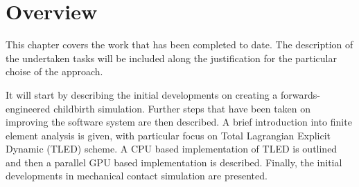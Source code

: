 \section{Overview}\label{methodology-overview}

This chapter covers the work that has been completed to date. The description of the undertaken tasks will be included along the justification for the particular choise of the approach.

It will start by describing the initial developments on creating a forwards-engineered childbirth simulation. Further steps that have been taken on improving the software system are then described. A brief introduction into finite element analysis is given, with particular focus on Total Lagrangian Explicit Dynamic (TLED) scheme. A CPU based implementation of TLED is outlined and then a parallel GPU based implementation is described. Finally, the initial developments in mechanical contact simulation are presented.
